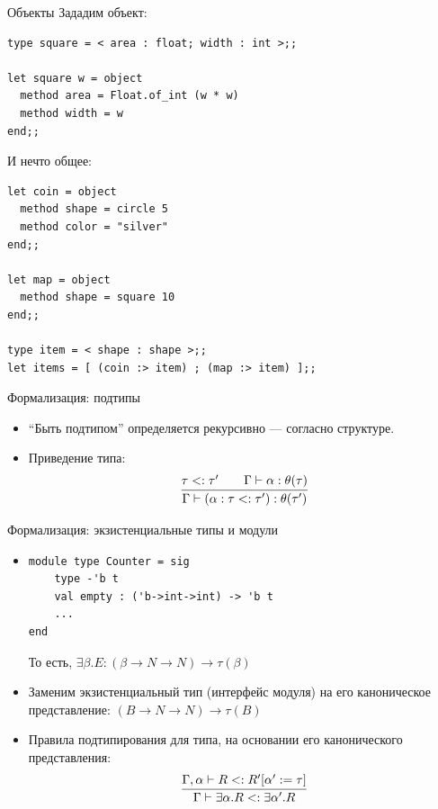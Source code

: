 \documentclass[aspectratio=169,dvipsnames,usenames]{beamer}
\begin{document}
\begin{frame}[fragile]{Объекты}
Зададим объект:

\footnotesize
\begin{verbatim}
type square = < area : float; width : int >;;

let square w = object
  method area = Float.of_int (w * w)
  method width = w
end;;
\end{verbatim}

\normalsize
И нечто общее:

\footnotesize
\begin{verbatim}
let coin = object
  method shape = circle 5
  method color = "silver"
end;;

let map = object
  method shape = square 10
end;;

type item = < shape : shape >;;
let items = [ (coin :> item) ; (map :> item) ];;
\end{verbatim}
\end{frame}

\begin{frame}{Формализация: подтипы}
\begin{itemize}
\item ``Быть подтипом'' определяется рекурсивно --- согласно структуре.
\item Приведение типа:
$$\infer{\Gamma\vdash(\alpha: \tau<:\tau'):\theta(\tau')}{\tau <: \tau'\quad\quad\Gamma\vdash\alpha:\theta(\tau)}$$
\end{itemize}
\end{frame}

\begin{frame}[fragile]{Формализация: экзистенциальные типы и модули}
\begin{itemize}
\item 
\begin{verbatim}
module type Counter = sig
    type -'b t
    val empty : ('b->int->int) -> 'b t
    ...
end
\end{verbatim}
То есть, $\exists \beta.E : (\beta\rightarrow N \rightarrow N) \rightarrow \tau(\beta)$
\item Заменим экзистенциальный тип (интерфейс модуля) на его каноническое представление:
$(B\rightarrow N \rightarrow N)\rightarrow \tau(B)$
\item Правила подтипирования для типа, на основании его канонического представления:
$$ \infer{\Gamma\vdash\exists\alpha.R <: \exists\alpha'.R}{\Gamma,\alpha\vdash R<: R'[\alpha':=\tau]}$$
\end{itemize}
\end{frame}
\end{document}
